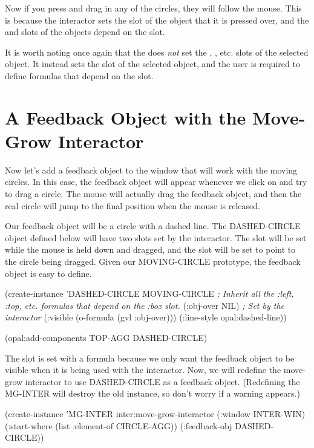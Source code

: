 Now if you press and drag in any of the circles, they will follow the
mouse.  This is because the interactor sets the  slot of the
object that it is pressed over, and the  and  slots
of the objects depend on the  slot.

It is worth noting once again that the  does
{\it not} set the , , etc. slots of the selected
object.  It instead sets the {\it {}} slot of the selected
object, and the user is required to define formulas that depend on the
 slot.


\section{A Feedback Object with the Move-Grow Interactor}

Now let's add a feedback object to the window that will work with the
moving circles.  In this case, the feedback object will appear
whenever we click on and try to drag a circle.  The mouse will
actually drag the feedback object, and then the real circle will jump
to the final position when the mouse is released.

Our feedback object will be a circle with a dashed line.  The
DASHED-CIRCLE object defined below will have two slots set by the
interactor.  The  slot will be set while the mouse is held
down and dragged, and the  slot will be set to point to the
circle being dragged.  Given our MOVING-CIRCLE prototype, the feedback
object is easy to define.

\begin{programexample}
(create-instance 'DASHED-CIRCLE MOVING-CIRCLE
   {\it ; Inherit all the :left, :top, etc. formulas that depend on the :box slot.}
   (:obj-over NIL)  {\it ; Set by the interactor}
   (:visible (o-formula (gvl :obj-over)))
   (:line-style opal:dashed-line))

(opal:add-components TOP-AGG DASHED-CIRCLE)
\end{programexample}

The  slot is set with a formula because we only want the
feedback object to be visible when it is being used with the
interactor.  Now, we will redefine the move-grow interactor to use
DASHED-CIRCLE as a feedback object.  (Redefining the MG-INTER will
destroy the old instance, so don't worry if a warning appears.)

\begin{programexample}
(create-instance 'MG-INTER inter:move-grow-interactor
   (:window INTER-WIN)
   (:start-where (list :element-of CIRCLE-AGG))
   (:feedback-obj DASHED-CIRCLE))
\end{programexample}

